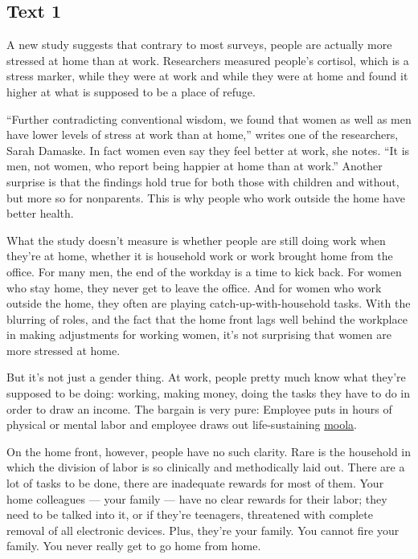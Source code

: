 \documentclass[UTF8,11pt]{ctexart}
\begin{document}
\subsection*{\textbf{Text 1}}


A new study suggests that contrary to most surveys, people are actually more stressed at home than at work. Researchers measured people’s cortisol, which is a stress marker, while they were at work and while they were at home and found it higher at what is supposed to be a place of refuge.


“Further contradicting conventional wisdom, we found that women as well as men have lower levels of stress at work than at home,” writes one of the researchers, Sarah Damaske. In fact women even say they feel better at work, she notes. “It is men, not women, who report being happier at home than at work.” Another surprise is that the findings hold true for both those with children and without, but more so for nonparents. This is why people who work outside the home have better health.


What the study doesn’t measure is whether people are still doing work when they’re at home, whether it is household work or work brought home from the office. For many men, the end of the workday is a time to kick back. For women who stay home, they never get to leave the office. And for women who work outside the home, they often are playing catch-up-with-household tasks. With the blurring of roles, and the fact that the home front lags well behind the workplace in making adjustments for working women, it’s not surprising that women are more stressed at home.


But it’s not just a gender thing. At work, people pretty much know what they’re supposed to be doing: working, making money, doing the tasks they have to do in order to draw an income. The bargain is very pure: Employee puts in hours of physical or mental labor and employee draws out life-sustaining \uline{moola}.


On the home front, however, people have no such clarity. Rare is the household in which the division of labor is so clinically and methodically laid out. There are a lot of tasks to be done, there are inadequate rewards for most of them. Your home colleagues — your family — have no clear rewards for their labor; they need to be talked into it, or if they’re teenagers, threatened with complete removal of all electronic devices. Plus, they’re your family. You cannot fire your family. You never really get to go home from home.
\end{document}
